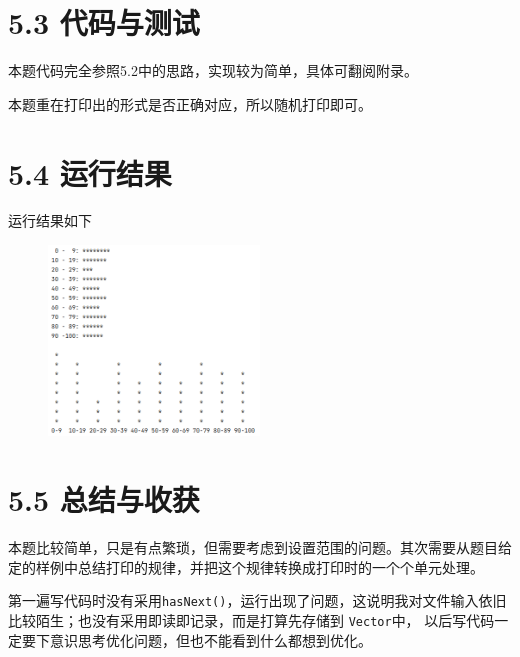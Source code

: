 \section{5.3 代码与测试}

本题代码完全参照5.2中的思路，实现较为简单，具体可翻阅附录。

本题重在打印出的形式是否正确对应，所以随机打印即可。

\section{5.4 运行结果}

运行结果如下

\begin{figure}[H]
    \centering
    \includegraphics[width = 0.5\textwidth]{../pic/5/5.1.png}
\end{figure}

\section{5.5 总结与收获}

本题比较简单，只是有点繁琐，但需要考虑到设置范围的问题。其次需要从题目给定的样例中总结打印的规律，并把这个规律转换成打印时的一个个单元处理。

第一遍写代码时没有采用\lstinline{hasNext()}，运行出现了问题，这说明我对文件输入依旧比较陌生；也没有采用即读即记录，而是打算先存储到
\lstinline{Vector}中，
以后写代码一定要下意识思考优化问题，但也不能看到什么都想到优化。